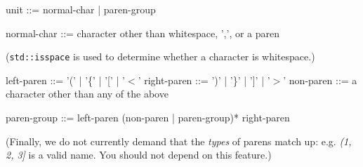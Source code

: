   unit  ::=  normal-char  |  paren-group

  normal-char ::=  character other than whitespace, ',', or a paren

(\texttt{std::isspace} is used to determine whether a character is
  whitespace.)

  left-paren   ::=  '(' | '\{' | '[' | '$<$'
  right-paren  ::=  ')' | '\}' | ']' | '$>$'
  non-paren  ::=  a character other than any of the above

  paren-group ::=  left-paren  (non-paren | paren-group)*  right-paren

(Finally, we do not currently demand that the \textsl{types} of parens
  match up: e.g. \textsl{(1, 2, 3]} is a valid name. You should not
    depend on this feature.)
